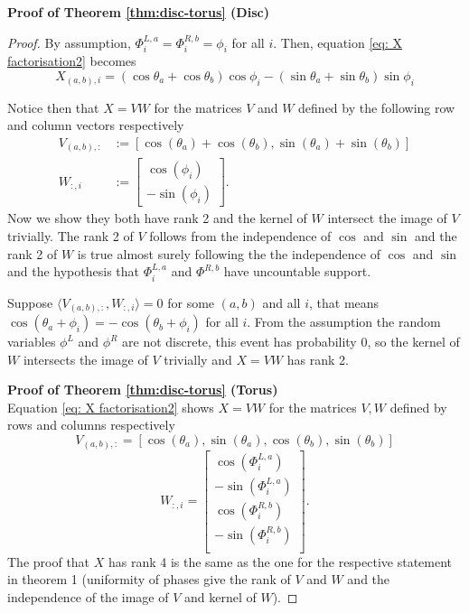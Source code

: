 \documentclass{article} %
\theoremstyle{plain}
\theoremstyle{definition}
\newtheorem{empirical fact}[theorem]{Empirical Fact}
\begin{document}
\textbf{Proof of Theorem \ref{thm:disc-torus} (Disc)}
\begin{proof}
By assumption, $\Phi^{L, a}_i = \Phi^{R, b}_i = \phi_i$ for all $i$. Then, equation \ref{eq: X factorisation2} becomes 
\begin{equation}\label{eq: X factorisation}
X_{(a,b),i} = (\cos\theta_a + \cos\theta_b)\cos\phi_i - (\sin\theta_a + \sin\theta_b)\sin\phi_i
\end{equation}

Notice then that $X=VW$ for the matrices $V$ and $W$ defined by the following row and column vectors respectively
\begin{align}
  V_{(a,b),:}&:=[\cos(\theta_a)+\cos(\theta_b), \sin(\theta_a)+\sin(\theta_b)] \\
  W_{:, i}&:=\begin{bmatrix}\cos(\phi_i)\\
  -\sin(\phi_i)\end{bmatrix}.
\end{align}
Now we show they both have rank 2 and the kernel of $W$ intersect the image of $V$ trivially. The rank 2 of $V$ follows from the independence of $\cos$ and $\sin$ and the rank 2 of $W$ is true almost surely following the the independence of $\cos$ and $\sin$ and the hypothesis that $\Phi^{L, a}_i$ and $\Phi^{R, b}$ have uncountable support.

Suppose $\langle V_{(a,b), :}, W_{:, i}\rangle = 0$ for some $(a,b)$ and all $i$, that means 
$\cos(\theta_a + \phi_i) = - \cos(\theta_b + \phi_i)$ for all $i$. From the assumption the random variables $\phi^L$ and $\phi^R$ are not discrete, this event has probability 0, so the kernel of $W$ intersects the image of $V$ trivially and $X = VW$ has rank 2.


\textbf{Proof of Theorem \ref{thm:disc-torus} (Torus)}\\

Equation \ref{eq: X factorisation2} shows $X=VW$ for the matrices $V, W$ defined by rows and columns respectively
\begin{equation}
    V_{(a,b), :} = [\cos(\theta_a), \sin(\theta_a), \cos(\theta_b), \sin(\theta_b)]
\end{equation}
\begin{equation}
    W_{:, i} =\begin{bmatrix}
    \cos(\Phi^{L, a}_i) \\
    -\sin(\Phi^{L, a}_i) \\
    \cos(\Phi^{R, b}_i) \\
    -\sin(\Phi^{R, b}_i) \\
    \end{bmatrix}.
\end{equation}
The proof that $X$ has rank 4 is the same as the one for the respective statement in theorem 1 (uniformity of phases give the rank of $V$ and $W$ and the independence of the image of $V$ and kernel of $W$).

\end{proof}
\end{document}
